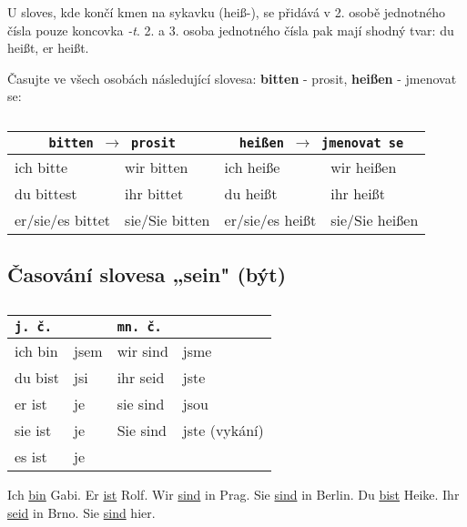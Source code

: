     U sloves, kde končí kmen na sykavku (hei{\ss}-), se přidává v 2. osobě jednotného čísla 
    pouze koncovka \emph{-t}. 2. a 3. osoba jednotného čísla pak mají shodný tvar: du hei{\ss}t, er 
    hei{\ss}t.
    
    Časujte ve všech osobách následující slovesa: \textbf{bitten} - prosit, \textbf{hei{\ss}en} - jmenovat se:  
    \begin{table}[ht!]   %
      \begin{tabular}{llll}
        \hline
        \multicolumn{2}{c}{\texttt{bitten \(\rightarrow\) prosit}} & 
        \multicolumn{2}{c}{\texttt{hei{\ss}en \(\rightarrow\) jmenovat se}}     \\
        \hline   
        ich bitte         & wir bitten      & ich hei{\ss}e        & wir hei{\ss}en     \\
        du bittest        & ihr bittet      & du hei{\ss}t         & ihr hei{\ss}t      \\
        er/sie/es bittet  & sie/Sie bitten  & er/sie/es hei{\ss}t  & sie/Sie hei{\ss}en \\
        \hline
      \end{tabular}
      \caption*{ }
    \end{table}

  \subsection*{Časování slovesa „sein" (být)}
    \begin{table}[ht!]   %
      \begin{tabular}{llll}
        \hline
          \multicolumn{2}{l}{\texttt{j. č.}}  & 
          \multicolumn{2}{l}{\texttt{mn. č.}}  \\  
        \hline
         ich bin  & jsem & wir sind & jsme          \\
         du  bist & jsi  & ihr seid & jste          \\
         er  ist  & je   & sie sind & jsou          \\
         sie ist  & je   & Sie sind & jste (vykání) \\
         es  ist  & je   &     &                    \\
        \hline
      \end{tabular}
      \caption*{ }
    \end{table}
    
    Ich \underline{bin} Gabi. Er \underline{ist} Rolf. Wir \underline{sind} in Prag. Sie 
    \underline{sind} in Berlin. Du \underline{bist} Heike. Ihr \underline{seid} in Brno. Sie 
    \underline{sind} hier. 


